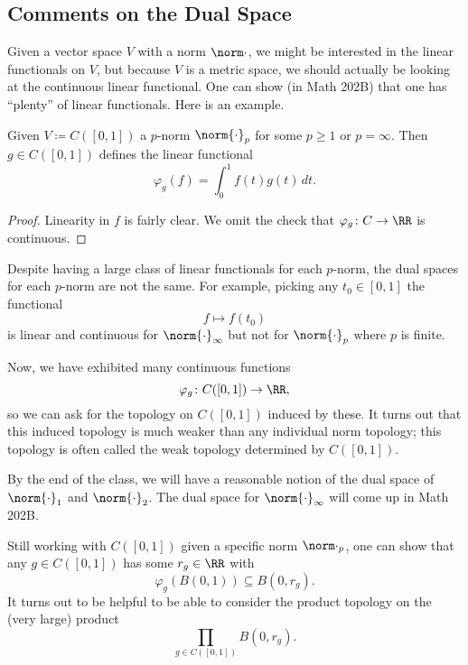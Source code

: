\documentclass[../notes.tex]{subfiles}
\begin{document}
\subsection{Comments on the Dual Space}
Given a vector space $V$ with a norm $\norm\cdot$, we might be interested in the linear functionals on $V$, but because $V$ is a metric space, we should actually be looking at the continuous linear functional. One can show (in Math 202B) that one has ``plenty'' of linear functionals. Here is an example.
\begin{exe}
	Given $V\coloneqq C([0,1])$ a $p$-norm $\norm{\cdot}_p$ for some $p\ge1$ or $p=\infty$. Then $g\in C([0,1])$ defines the linear functional
	\[\varphi_g(f)=\int_0^1f(t)g(t)\,dt.\]
\end{exe}
\begin{proof}
	Linearity in $f$ is fairly clear. We omit the check that $\varphi_g\colon C\to\RR$ is continuous.
\end{proof}
\begin{remark}
	Despite having a large class of linear functionals for each $p$-norm, the dual spaces for each $p$-norm are not the same. For example, picking any $t_0\in[0,1]$ the functional
	\[f\mapsto f(t_0)\]
	is linear and continuous for $\norm{\cdot}_\infty$ but not for $\norm{\cdot}_p$ where $p$ is finite.
\end{remark}
\begin{remark}
	Now, we have exhibited many continuous functions
	\[\varphi_g\colon C([0,1])\to\RR,\]
	so we can ask for the topology on $C([0,1])$ induced by these. It turns out that this induced topology is much weaker than any individual norm topology; this topology is often called the weak topology determined by $C([0,1])$.
\end{remark}
\begin{remark}
	By the end of the class, we will have a reasonable notion of the dual space of $\norm{\cdot}_1$ and $\norm{\cdot}_2$. The dual space for $\norm{\cdot}_\infty$ will come up in Math 202B.
\end{remark}
\begin{remark}
	Still working with $C([0,1])$ given a specific norm $\norm\cdot_p$, one can show that any $g\in C([0,1])$ has some $r_g\in\RR$ with
	\[\varphi_g(B(0,1))\subseteq B(0,r_g).\]
	It turns out to be helpful to be able to consider the product topology on the (very large) product
	\[\prod_{g\in C([0,1])}B(0,r_g).\]
\end{remark}
\end{document}
